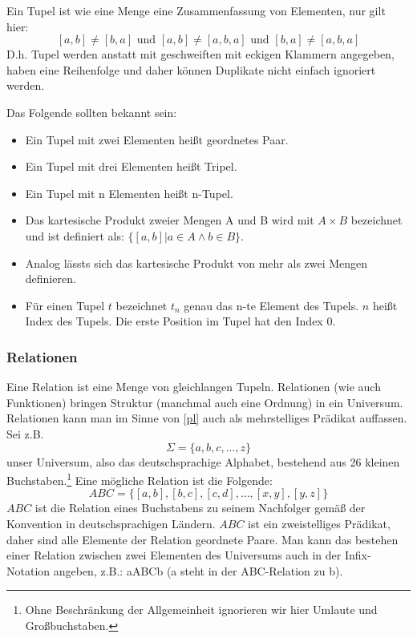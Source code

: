 Ein Tupel ist wie eine Menge eine Zusammenfassung von Elementen, nur gilt hier:
\[[a,b] \neq [b,a] \text{ und } [a,b] \neq [a,b,a] \text{ und } [b,a] \neq [a,b,a]\]
D.h. Tupel werden anstatt mit geschweiften mit eckigen Klammern angegeben,
haben eine Reihenfolge und daher können Duplikate nicht einfach ignoriert werden.

\noindent
Das Folgende sollten bekannt sein:
\begin{itemize}
    \item Ein Tupel mit zwei Elementen heißt geordnetes Paar.
    \item Ein Tupel mit drei Elementen heißt Tripel.
    \item Ein Tupel mit n    Elementen heißt n-Tupel.
    \item Das kartesische Produkt zweier Mengen A und B wird mit $A \times B$ bezeichnet
          und ist definiert als: $\{[a,b]|a \in A \wedge b \in B\}$.
    \item Analog lässts sich das kartesische Produkt von mehr als zwei Mengen definieren.
    \item Für einen Tupel $t$ bezeichnet $t_n$ genau das n-te Element des Tupels.
        $n$ heißt Index des Tupels. Die erste Position im Tupel hat den Index 0.
\end{itemize}

\subsubsection{Relationen}

Eine Relation ist eine Menge von gleichlangen Tupeln.
Relationen (wie auch Funktionen) bringen Struktur (manchmal auch eine Ordnung)
in ein Universum.
Relationen kann man im Sinne von \autoref{pl} auch als mehrstelliges Prädikat auffassen.
Sei z.B.
\[
    \Sigma = \{a,b,c,...,z\}
\]
unser Universum, also das deutschsprachige Alphabet,
bestehend aus 26 kleinen Buchstaben.\footnote{
Ohne Beschränkung der Allgemeinheit ignorieren wir hier Umlaute und Großbuchstaben.}
Eine mögliche Relation ist die Folgende:
\[
    ABC = \{[a,b], [b,c], [c,d], \ldots, [x,y], [y,z]\}
\]
$ABC$ ist die Relation eines Buchstabens zu seinem Nachfolger
gemäß der Konvention in deutschsprachigen Ländern.
$ABC$ ist ein zweistelliges Prädikat, daher sind alle Elemente der Relation geordnete Paare.
Man kann das bestehen einer Relation zwischen zwei Elementen des Universums
auch in der Infix-Notation angeben, z.B.: aABCb (a steht in der ABC-Relation zu b).

